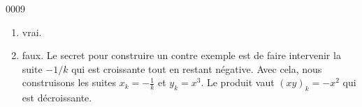 
\begin{corrige}{0009}

\begin{enumerate}
\item vrai.
\item faux. Le secret pour construire un contre exemple est de faire intervenir la suite $-1/k$ qui est croissante tout en restant négative. Avec cela, nous construisons les suites $x_k=-\frac{1}{ k }$ et $y_k=x^3$. Le produit vaut $(xy)_k=-x^2$ qui est décroissante. 
\end{enumerate}

\end{corrige}
